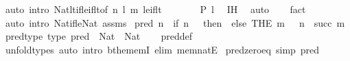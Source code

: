 \begin{isabellebody}
\ {\isacharparenleft}{\kern0pt}auto\ intro{\isacharbang}{\kern0pt}{\isacharcolon}{\kern0pt}\ Nat{\isacharunderscore}{\kern0pt}lt{\isacharunderscore}{\kern0pt}if{\isacharunderscore}{\kern0pt}le{\isacharunderscore}{\kern0pt}if{\isacharunderscore}{\kern0pt}lt{\isacharbrackleft}{\kern0pt}of\ n\ l\ m{\isacharbrackright}{\kern0pt}\ le{\isacharunderscore}{\kern0pt}if{\isacharunderscore}{\kern0pt}lt{\isacharparenright}{\kern0pt}\isanewline
\ \ \ \ \isamarkupfalse%
\ \isamarkupfalse%
\ {\isachardoublequoteopen}P\ l{\isachardoublequoteclose}\ \isamarkupfalse%
\ IH\ \isamarkupfalse%
\ auto\isanewline
\ \ \isamarkupfalse%
\ fact{\isacharplus}{\kern0pt}\isanewline
{}\isamarkupfalse%
\ {\isacharparenleft}{\kern0pt}auto\ intro{\isacharcolon}{\kern0pt}\ Nat{\isacharunderscore}{\kern0pt}if{\isacharunderscore}{\kern0pt}le{\isacharunderscore}{\kern0pt}Nat\ assms{\isacharparenright}{\kern0pt}%
\endisatagproof
{\isafoldproof}%
%
\isadelimproof
%
\endisadelimproof
%
\isadelimdocument
%
\endisadelimdocument
%
\isatagdocument
%
\isamarkuptrue%
%
\endisatagdocument
{\isafolddocument}%
%
\isadelimdocument
%
\endisadelimdocument
{}\isamarkupfalse%
\ {\isachardoublequoteopen}pred\ n\ {\isacharequal}{\kern0pt}\ {\isacharparenleft}{\kern0pt}if\ n\ {\isacharequal}{\kern0pt}\ {}\ then\ {}\ else\ {\isacharparenleft}{\kern0pt}THE\ m\ {\isasymin}\ {\isasymnat}{\isachardot}{\kern0pt}\ n\ {\isacharequal}{\kern0pt}\ succ\ m{\isacharparenright}{\kern0pt}{\isacharparenright}{\kern0pt}{\isachardoublequoteclose}\isanewline
\isanewline
{}\isamarkupfalse%
\ pred{\isacharunderscore}{\kern0pt}type\ {\isacharbrackleft}{\kern0pt}type{\isacharbrackright}{\kern0pt}{\isacharcolon}{\kern0pt}\ {\isachardoublequoteopen}pred\ {\isacharcolon}{\kern0pt}\ Nat\ {\isasymRightarrow}\ Nat{\isachardoublequoteclose}\isanewline
%
\isadelimproof
\ \ %
\endisadelimproof
%
\isatagproof
{}\isamarkupfalse%
\ pred{\isacharunderscore}{\kern0pt}def\ \isamarkupfalse%
\ unfold{\isacharunderscore}{\kern0pt}types\ {\isacharparenleft}{\kern0pt}auto\ intro{\isacharcolon}{\kern0pt}\ bthe{\isacharunderscore}{\kern0pt}memI\ elim{\isacharcolon}{\kern0pt}\ mem{\isacharunderscore}{\kern0pt}natE{\isacharparenright}{\kern0pt}%
\endisatagproof
{\isafoldproof}%
%
\isadelimproof
\isanewline
%
\endisadelimproof
\isanewline
{}\isamarkupfalse%
\ pred{\isacharunderscore}{\kern0pt}zero{\isacharunderscore}{\kern0pt}eq\ {\isacharbrackleft}{\kern0pt}simp{\isacharbrackright}{\kern0pt}{\isacharcolon}{\kern0pt}\ {\isachardoublequoteopen}pred\ {}\ {\isacharequal}{\kern0pt}\ {}{\isachardoublequoteclose}\isanewline

\end{isabellebody}
